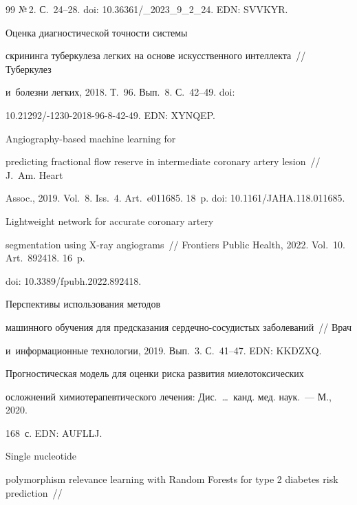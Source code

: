 {{\begin{thebibliography}{99}
№\,2. С.~24--28. doi: 10.36361\!/\_2023\_9\_2\_24. EDN: SVVKYR.


 Оценка диагностической точности системы 

скрининга туберкулеза легких на основе искусственного интеллекта~/\!\!/ Туберкулез 

и~болезни легких, 2018. Т.~96. Вып.~8. С.~42--49. doi:  

10.21292\!/-1230-2018-96-8-42-49.  EDN: XYNQEP.


 Angiography-based machine learning for 

predicting fractional flow reserve in intermediate coronary artery lesion~/\!\!/ J.~Am. Heart 

Assoc., 2019. Vol.~8. Iss.~4. Art.~e011685. 18~p. doi: 10.1161\!/\!JAHA.118.011685.


 Lightweight network for accurate coronary artery 

segmentation using X-ray angiograms~/\!\!/ Frontiers Public Health, 2022. Vol.~10. Art.~892418. 16~p.

doi: 10.3389\!/\!fpubh.2022.892418.


 Перспективы использования методов 

машинного обучения для предсказания сер\-деч\-но-со\-су\-дистых заболеваний~/\!\!/ Врач 

и~информационные технологии, 2019. Вып.~3. С.~41--47. EDN: KKDZXQ.


 Прогностическая модель для оценки риска развития миелотоксических 

осложнений химиотерапевтического лечения: Дис.\ \ldots\  канд. мед. наук.~--- М., 2020. 

168~с. EDN: AUFLLJ.


 Single nucleotide 

polymorphism relevance learning with Random Forests for type 2 diabetes risk prediction~/\!\!/ 


\end{thebibliography}}}
